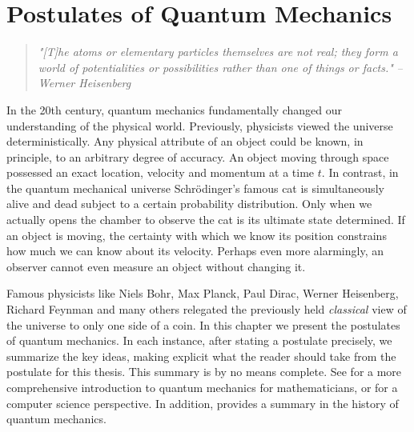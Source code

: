 
\chapter{Postulates of Quantum Mechanics} %

\label{Chapter3-postulates} %

\begin{quote}
\textit{"[T]he atoms or elementary particles themselves are not real; they form a world of potentialities or possibilities rather than one of things or facts."}
\bigskip
\hfill \textit{--Werner Heisenberg}
\end{quote}

In the 20th century, quantum mechanics fundamentally changed our understanding of the physical world.  Previously, physicists viewed the universe deterministically.  Any physical attribute of an object could be known, in principle, to an arbitrary degree of accuracy.  An object moving through space possessed an exact location, velocity and momentum at a time $t$. In contrast, in the quantum mechanical universe Schrödinger's famous cat is simultaneously alive and dead subject to a certain probability distribution.  Only when we actually opens the chamber to observe the cat is its ultimate state determined. If an object is moving, the certainty with which we know its position constrains how much we can know about its velocity.  Perhaps even more alarmingly, an observer cannot even measure an object without changing it.

Famous physicists like Niels Bohr, Max Planck, Paul Dirac, Werner Heisenberg, Richard Feynman and many others relegated the previously held {\emph{classical}} view of the universe to only one side of a coin.  In this chapter we present the postulates of quantum mechanics.  In each instance, after stating a postulate precisely, we summarize the key ideas, making explicit what the reader should take from the postulate for this thesis.  This summary is by no means complete.  See \cite{hall2013quantum} for a more comprehensive introduction to quantum mechanics for mathematicians, or \cite{rieffel1998introduction} for a computer science perspective. In addition, \cite{dorai2018} provides a summary in the history of quantum mechanics.

\pagebreak
